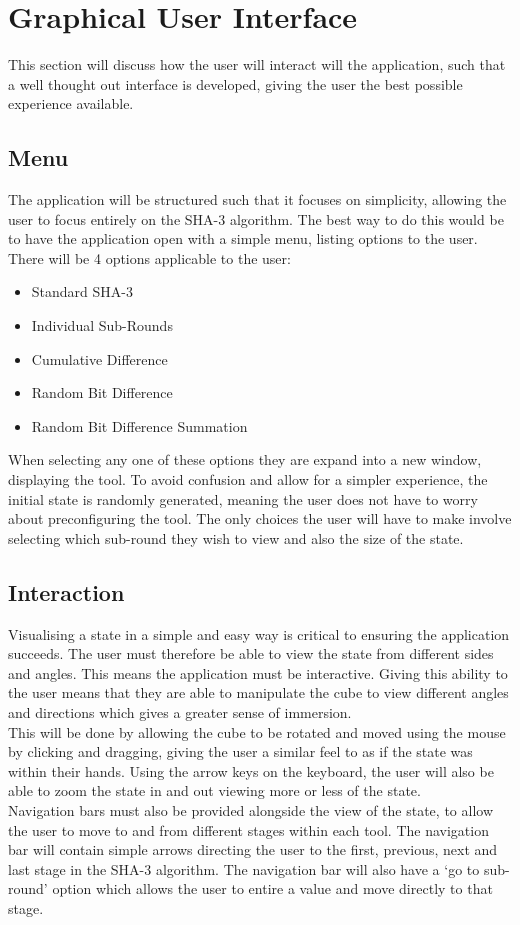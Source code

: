 \section{Graphical User Interface}
This section will discuss how the user will interact will the application, such that a well thought out interface is developed, giving the user the best possible experience available.
\subsection{Menu}
The application will be structured such that it focuses on simplicity, allowing the user to focus entirely on the SHA-3 algorithm. The best way to do this would be to have the application open with a simple menu, listing options to the user.
\vspace{5 mm}\\
There will be 4 options applicable to the user:
\begin{itemize}
\item Standard SHA-3
\item Individual Sub-Rounds
\item Cumulative Difference
\item Random Bit Difference
\item Random Bit Difference Summation
\end{itemize}
When selecting any one of these options they are expand into a new window, displaying the tool. To avoid confusion and allow for a simpler experience, the initial state is randomly generated, meaning the user does not have to worry about preconfiguring the tool. The only choices the user will have to make involve selecting which sub-round they wish to view and also the size of the state.
\subsection{Interaction}
Visualising a state in a simple and easy way is critical to ensuring the application succeeds. The user must therefore be able to view the state from different sides and angles. This means the application must be interactive. Giving this ability to the user means that they are able to manipulate the cube to view different angles and directions which gives a greater sense of immersion.
\vspace{5 mm}\\
This will be done by allowing the cube to be rotated and moved using the mouse by clicking and dragging, giving the user a similar feel to as if the state was within their hands. Using the arrow keys on the keyboard, the user will also be able to zoom the state in and out viewing more or less of the state.
\vspace{5 mm}\\
Navigation bars must also be provided alongside the view of the state, to allow the user to move to and from different stages within each tool. The navigation bar will contain simple arrows directing the user to the first, previous, next and last stage in the SHA-3 algorithm. The navigation bar will also have a `go to sub-round' option which allows the user to entire a value and move directly to that stage.
